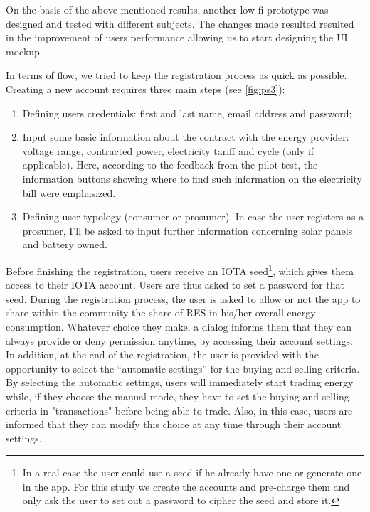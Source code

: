 On the basis of the above-mentioned results, another low-fi prototype was designed and tested with different subjects. The changes made resulted resulted in the improvement of users performance allowing us to start designing the \ac{UI} mockup.

In terms of flow, we tried to keep the registration process as quick as possible. Creating a new account requires three main steps (see \cref{fig:ps3}):
\begin{enumerate}
    \item Defining users credentials: first and last name, email address and password;
    \item Input some basic information about the contract with the energy provider: voltage range, contracted power, electricity tariff and cycle (only if applicable). Here, according to the feedback from the pilot test, the information buttons showing where to find such information on the electricity bill were emphasized.
    \item Defining user typology (consumer or prosumer). In case the user registers as a prosumer, I’ll be asked to input further information concerning solar panels and battery owned.
\end{enumerate}


Before finishing the registration, users receive an IOTA seed\footnote{In a real case the user could use a seed if he already have one or generate one in the app. For this study we create the accounts and pre-charge them and only ask the user to set out a password to cipher the seed and store it.}, which gives them access to their IOTA account. Users are thus asked to set a password for that seed.
During the registration process, the user is asked to allow or not the app to share within the community the share of RES in his/her overall energy consumption. Whatever choice they make, a dialog informs them that they can always provide or deny permission anytime, by accessing their account settings. In addition, at the end of the registration, the user is provided with the opportunity to select the “automatic settings” for the buying and selling criteria. By selecting the automatic settings, users will immediately start trading energy while, if they choose the manual mode, they have to set the buying and selling criteria in "transactions" before being able to trade. Also, in this case, users are informed that they can modify this choice at any time through their account settings.

